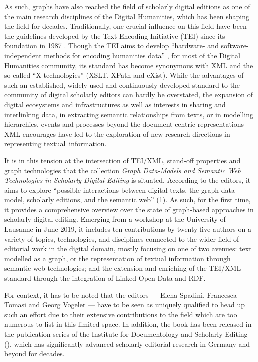 \begin{review}
As such, graphs have also reached the field of scholarly digital
editions as one of the main research disciplines of the Digital
Humanities, which has been shaping the field for decades. Traditionally,
one crucial influence on this field have been the guidelines developed
by the Text Encoding Initiative (TEI) since its foundation in 1987 \parencite{tei_consortium_tei_2007}. Though the
TEI aims to develop ``hardware- and software-independent methods for
encoding humanities data'' \parencite{tei_consortium_history_2023}, for most of the Digital Humanities
community, its standard has become synonymous with XML and the so-called
\mbox{``X-technologies''} (XSLT, XPath and eXist). While the advantages of
such an established, widely used and continuously developed standard to
the community of digital scholarly editors can hardly be overstated, the
expansion of digital ecosystems and infrastructures as well as interests
in sharing and interlinking data, in extracting semantic relationships
from texts, or in modelling hierarchies, events and processes beyond the
document-centric representations XML encourages have led to the
exploration of new research directions in representing \mbox{textual
information.}

It is in this tension at the intersection of TEI/XML, stand-off
properties and graph technologies that the collection \emph{Graph
Data-Models and Semantic Web Technologies in Scholarly Digital Editing}
is situated. According to the editors, it aims to explore ``possible
interactions between digital texts, the graph data-model, scholarly
editions, and the semantic web'' (1). As such, for the first time, it
provides a comprehensive overview over the state of graph-based
approaches in scholarly digital editing. Emerging from a workshop at the
University of Lausanne in June 2019, it includes ten contributions by
twenty-five authors on a variety of topics, technologies, and
disciplines connected to the wider field of editorial work in the
digital domain, mostly focusing on one of two avenues: text modelled as
a graph, or the representation of textual information through semantic
web technologies; and the extension and enriching of the TEI/XML
standard through the integration of Linked Open Data and RDF.

For context, it has to be noted that the editors --- Elena Spadini,
Francesca Tomasi and Georg Vogeler --- have to be seen as uniquely
qualified to head up such an effort due to their extensive contributions
to the field which are too numerous to list in this limited space. In
addition, the book has been released in the publication series of the
Institute for Documentology and Scholarly Editing (\citeyear{institute_of_documentary_and_scholarly_editing_schriftenreihe_2023}), which has significantly advanced
scholarly editorial research in Germany and beyond for decades.


\end{review}

